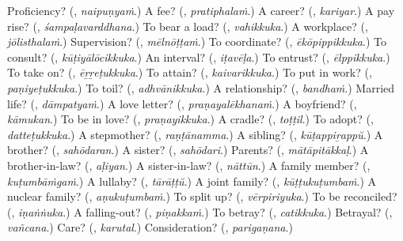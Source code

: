 \begin{tcolorbox}[breakable,colback=teal!4,colframe=teal!35!black,title={Before you move on}]
Proficiency? (\textbf{}, \emph{naipuṇyaṁ}.) A fee? (\textbf{}, \emph{pratiphalaṁ}.) A career? (\textbf{}, \emph{kariyar}.) A pay rise? (\textbf{}, \emph{śampaḷavarddhana}.) To bear a load? (\textbf{}, \emph{vahikkuka}.) A workplace? (\textbf{}, \emph{jōlisthalaṁ}.) Supervision? (\textbf{}, \emph{mēlnōṭṭaṁ}.) To coordinate? (\textbf{}, \emph{ēkōpippikkuka}.) To consult? (\textbf{}, \emph{kūṭiyālōcikkuka}.) An interval? (\textbf{}, \emph{iṭavēḷa}.) To entrust? (\textbf{}, \emph{ēlppikkuka}.) To take on? (\textbf{}, \emph{ēṟṟeṭukkuka}.) To attain? (\textbf{}, \emph{kaivarikkuka}.) To put in work? (\textbf{}, \emph{paṇiyeṭukkuka}.) To toil? (\textbf{}, \emph{adhvānikkuka}.) A relationship? (\textbf{}, \emph{bandhaṁ}.) Married life? (\textbf{}, \emph{dāmpatyaṁ}.) A love letter? (\textbf{}, \emph{praṇayalēkhanaṁ}.) A boyfriend? (\textbf{}, \emph{kāmukan}.) To be in love? (\textbf{}, \emph{praṇayikkuka}.) A cradle? (\textbf{}, \emph{toṭṭil}.) To adopt? (\textbf{}, \emph{datteṭukkuka}.) A stepmother? (\textbf{}, \emph{raṇṭānamma}.) A sibling? (\textbf{}, \emph{kūṭappiṟappŭ}.) A brother? (\textbf{}, \emph{sahōdaran}.) A sister? (\textbf{}, \emph{sahōdari}.) Parents? (\textbf{}, \emph{mātāpitākkaḷ}.) A brother-in-law? (\textbf{}, \emph{aḷiyan}.) A sister-in-law? (\textbf{}, \emph{nāttūn}.) A family member? (\textbf{}, \emph{kuṭumbāṁgaṁ}.) A lullaby? (\textbf{}, \emph{tārāṭṭŭ}.) A joint family? (\textbf{}, \emph{kūṭṭukuṭumbaṁ}.) A nuclear family? (\textbf{}, \emph{aṇukuṭumbaṁ}.) To split up? (\textbf{}, \emph{vērpiriyuka}.) To be reconciled? (\textbf{}, \emph{iṇaṅṅuka}.) A falling-out? (\textbf{}, \emph{piṇakkaṁ}.) To betray? (\textbf{}, \emph{catikkuka}.) Betrayal? (\textbf{}, \emph{vañcana}.) Care? (\textbf{}, \emph{karutal}.) Consideration? (\textbf{}, \emph{parigaṇana}.)
\end{tcolorbox}
